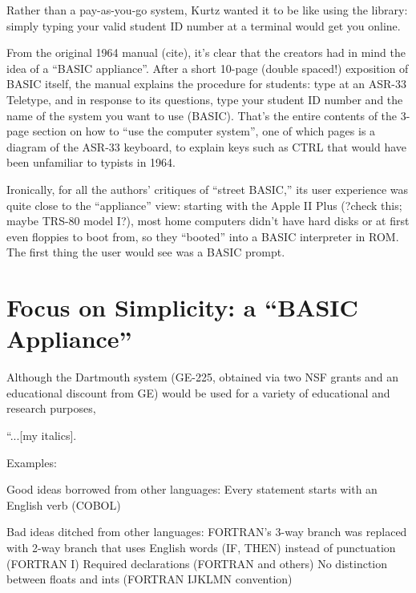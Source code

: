 \documentclass{article}
\begin{document}
Rather than a
pay-as-you-go system, Kurtz wanted it to be like using the library:
simply typing your valid student ID number at a terminal would get you
online.

From the original 1964 manual (cite), it's clear that the creators had
in mind the idea of a ``BASIC appliance''.  After a short 10-page
(double spaced!) exposition of BASIC itself, the manual
explains the procedure for students: type  at an ASR-33
Teletype, and in response to its questions, type your student ID number
and the name of the system you want to use (BASIC).  That's the entire
contents of the  3-page section on how to ``use the computer system'',
one of which pages is a diagram of the ASR-33 keyboard,
to explain keys such as CTRL that would have been unfamiliar to
typists in 1964.

Ironically, for all the authors' critiques of ``street BASIC,'' its user
experience was quite close to the ``appliance'' view: starting with the
Apple II Plus (?check this; maybe TRS-80 model I?), most home computers
didn't have hard disks or at first even floppies to boot from, so they
``booted'' into a BASIC interpreter in ROM.  The first thing the user
would see was a BASIC prompt. 


\section{Focus on Simplicity: a ``BASIC Appliance''}


Although the Dartmouth system (GE-225, obtained via two NSF grants and
an educational discount from GE) would be used for a variety of
educational and research purposes, 

``...[my italics].

Examples:

Good ideas borrowed from other languages:
Every statement starts with an English verb (COBOL)

Bad ideas ditched from other languages:
FORTRAN's 3-way branch was replaced with 2-way branch that uses English words (IF,
THEN) instead of punctuation (FORTRAN I)
Required declarations (FORTRAN and others)
No distinction between floats and ints (FORTRAN IJKLMN convention)
\end{document}
